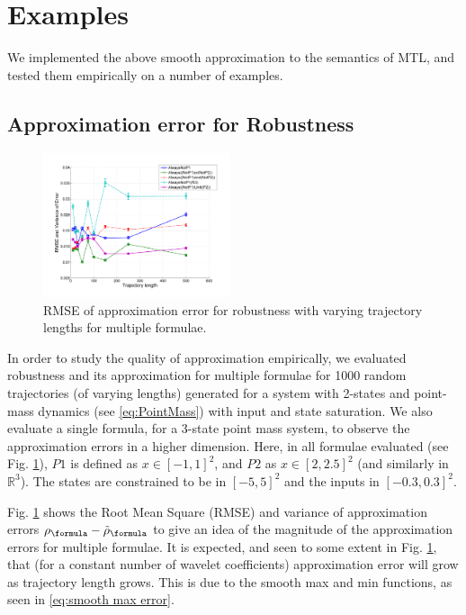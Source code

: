 \section{Examples}
\label{sec:examples}
We implemented the above smooth approximation to the semantics of MTL, and tested them empirically on a number of examples.

\subsection{Approximation error for Robustness}
\label{sec: ex apx error}
\begin{figure}[t]
\centering
\includegraphics[width=0.49\textwidth]{figures/RobustnessError}
\caption{RMSE of approximation error for robustness with varying trajectory lengths for multiple formulae.}
\label{fig:sample result}
\end{figure}

In order to study the quality of approximation empirically, we evaluated robustness and its approximation for multiple formulae for 1000 random trajectories (of varying lengths) generated for a system with 2-states and point-mass dynamics (see \eqref{eq:PointMass}) with input and state saturation. We also evaluate a single formula, for a 3-state point mass system, to observe the approximation errors in a higher dimension. Here, in all formulae evaluated (see Fig. \ref{fig:sample result}), $P1$ is defined as $x \in [-1,1]^2$, and $P2$ as $x\in [2,2.5]^2$ (and similarly in $\mathbb{R}^3$). The states are constrained to be in $[-5,5]^2$ and the inputs in $[-0.3,0.3]^2$. 

Fig. \ref{fig:sample result} shows the Root Mean Square (RMSE) and variance of approximation errors $\robf-\srobf$ to give an idea of the magnitude of the approximation errors for multiple formulae. 
It is expected, and seen to some extent in Fig. \ref{fig:sample result}, that (for a constant number of wavelet coefficients) approximation error will grow as trajectory length grows. This is due to the smooth max and min functions, as seen in \eqref{eq:smooth max error}.

